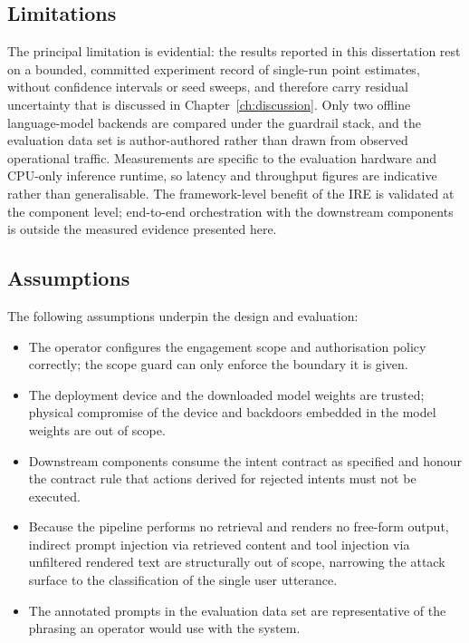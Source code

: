 \subsection*{Limitations}

The principal limitation is evidential: the results reported in this
dissertation rest on a bounded, committed experiment record of
single-run point estimates, without confidence intervals or seed sweeps, and
therefore carry residual uncertainty that is discussed in
Chapter~\ref{ch:discussion}. Only two offline language-model backends are
compared under the guardrail stack, and the evaluation data set is
author-authored rather than drawn from observed operational traffic.
Measurements are specific to the evaluation hardware and CPU-only inference
runtime, so latency and throughput figures are indicative rather than
generalisable. The framework-level benefit of the IRE is validated at the
component level; end-to-end orchestration with the downstream components is
outside the measured evidence presented here.

\subsection*{Assumptions}

The following assumptions underpin the design and evaluation:
\begin{itemize}
\item The operator configures the engagement scope and authorisation policy
correctly; the scope guard can only enforce the boundary it is given.
\item The deployment device and the downloaded model weights are trusted;
physical compromise of the device and backdoors embedded in the model weights
are out of scope.
\item Downstream components consume the intent contract as specified and
honour the contract rule that actions derived for rejected intents must not be
executed.
\item Because the pipeline performs no retrieval and renders no free-form
output, indirect prompt injection via retrieved content and tool injection via
unfiltered rendered text are structurally out of scope, narrowing the attack
surface to the classification of the single user utterance.
\item The annotated prompts in the evaluation data set are representative of
the phrasing an operator would use with the system.
\end{itemize}

